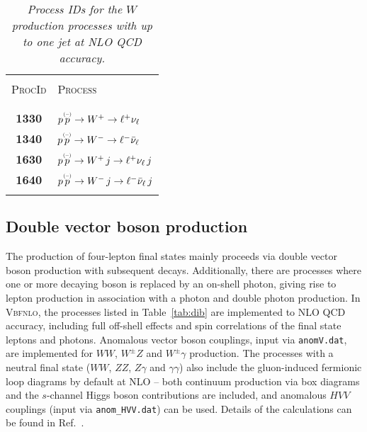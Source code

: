 \documentclass[english,12pt]{article}
\begin{document}
\begin{table}[t!]
\newcommand{\lstrut}{{$\strut\atop\strut$}}
\begin{center}
\small
\begin{tabular}{c|l}
\hline
&\\
\textsc{ProcId} & \textsc{Process}  \\
&\\
\hline
&\\
\bf 1330 & $p \overset{\mbox{\tiny{(--)}}}{p} \to W^+ \to \ell^+\nu_{\ell} $ \\
\bf 1340 & $p \overset{\mbox{\tiny{(--)}}}{p} \to W^- \to \ell^- \bar{\nu}_{\ell} $ \\
\bf 1630 & $p \overset{\mbox{\tiny{(--)}}}{p} \to W^+ \, j \to \ell^+\nu_{\ell} \, j $ \\
\bf 1640 & $p \overset{\mbox{\tiny{(--)}}}{p} \to W^- \, j\to \ell^- \bar{\nu}_{\ell} \, j $ \\
&\\
\hline
\end{tabular}
\caption {\em  Process IDs for the $W$ production processes with up to one jet at NLO QCD accuracy.}
\vspace{0.2cm}
\label{tab:wj}
\end{center}
\end{table}

\subsection{Double vector boson production}
\label{ssec:diboson}
The production of four-lepton final states mainly proceeds via double vector
boson production with subsequent decays. Additionally, there are processes where
one or more decaying boson is replaced by an on-shell photon, giving rise to
lepton production in association with a photon and double photon production. In
\textsc{Vbfnlo}, the processes listed in Table~\ref{tab:dib} are implemented to
NLO QCD accuracy, including full off-shell effects and spin correlations of the
final state leptons and photons. Anomalous vector boson couplings, input via
{\tt anomV.dat}, are implemented for $WW$, $W^{\pm}Z$ and $W^{\pm}\gamma$
production. The processes with a neutral final state ($WW$, $ZZ$, $Z\gamma$ and
$\gamma\gamma$) also include the gluon-induced fermionic loop diagrams by
default at NLO -- both continuum production via box diagrams and the $s$-channel
Higgs boson contributions are included, and anomalous $HVV$ couplings (input via
{\tt anom\_HVV.dat}) can be used. 
Details of the calculations can be found in Ref.~\cite{johannes}.
\end{document}

